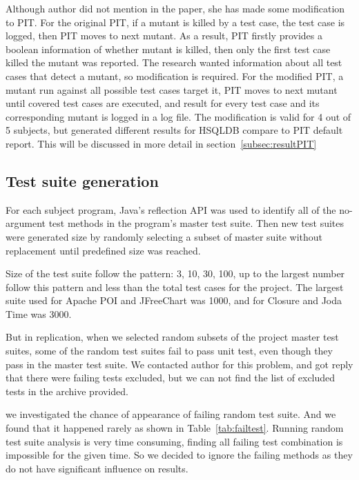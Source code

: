 Although author did not mention in the paper, she has made some modification to PIT. For the original PIT, if a mutant is killed by a test case, the test case is logged, then PIT moves to next mutant. As a result, PIT firstly provides a boolean information of whether mutant is killed, then only the first test case killed the mutant was reported. The research wanted information about all test cases that detect a mutant, so modification is required. For the modified PIT, a mutant run against all possible test cases target it, PIT moves to next mutant until covered test cases are executed, and result for every test case and its corresponding mutant is logged in a log file. The modification is valid for 4 out of 5 subjects, but generated different results for HSQLDB compare to PIT default report. This will be discussed in more detail in section~\ref{subsec:resultPIT}

\subsection{Test suite generation}
For each subject program, Java’s reflection API was used to identify all of the no-argument test methods in the program’s master test suite. Then new test suites were generated size by randomly selecting a subset of master suite without replacement until predefined size was reached.

Size of the test suite follow the pattern: 3, 10, 30, 100, up to the largest number follow this pattern and less than the total test cases for the project. The largest suite used for Apache POI and JFreeChart was 1000, and for Closure and Joda Time was 3000.

But in replication, when we selected random subsets of the project master test suites, some of the random test suites fail to pass unit test, even though they pass in the master test suite. We contacted author for this problem, and got reply that there were failing tests excluded, but we can not find the list of excluded tests in the archive provided.

we investigated the chance of appearance of failing random test suite. And we found that it happened rarely as shown in Table~\ref{tab:failtest}. Running random test suite analysis is very time consuming, finding all failing test combination is impossible for the given time. So we decided to ignore the failing methods as they do not have significant influence on results.

